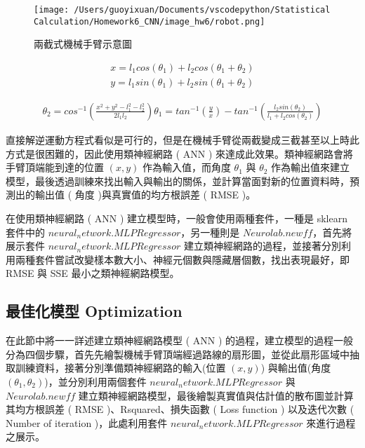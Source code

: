 \begin{figure}[H]
    \centering
        \texttt{[image: /Users/guoyixuan/Documents/vscodepython/Statistical Calculation/Homework6\_CNN/image\_hw6/robot.png]}
    \caption{兩截式機械手臂示意圖}
    \label{fig:robot}
\end{figure}

\begin{equation}\label{eq:fke}
\begin{split}
x=l_1 cos(\theta_1)+l_2 cos(\theta_1+\theta_2)\\
y=l_1 sin(\theta_1)+l_2 sin(\theta_1+\theta_2)
\end{split}
\end{equation}

\begin{equation}\label{eq:lke}
\begin{split}
\theta_2=cos^{-1}(\frac{x^2 + y^2 - l_1^2 - l_2^2}{2 l_1 l_2})
\theta_1 = tan^{-1}(\frac{y}{x})-tan^{-1}(\frac{l_2 sin(\theta_2)}{l_1 + l_2 cos(\theta_2)})
\end{split}
\end{equation}

直接解逆運動方程式看似是可行的，但是在機械手臂從兩截變成三截甚至以上時此方式是很困難的，因此使用類神經網路 ( ANN ) 來達成此效果。類神經網路會將手臂頂端能到達的位置 $(x,y)$ 作為輸入值，而角度 $\theta_1$ 與 $\theta_2$ 作為輸出值來建立模型，最後透過訓練來找出輸入與輸出的關係，並計算當面對新的位置資料時，預測出的輸出值 ( 角度 )與真實值的均方根誤差 ( RMSE )。

在使用類神經網路 ( ANN ) 建立模型時，一般會使用兩種套件，一種是 sklearn 套件中的 $neural_network.MLPRegressor$，另一種則是 $Neurolab.newff$，首先將展示套件 $neural_network.MLPRegressor$ 建立類神經網路的過程，並接著分別利用兩種套件嘗試改變樣本數大小、神經元個數與隱藏層個數，找出表現最好，即 RMSE 與 SSE 最小之類神經網路模型。

\subsection{最佳化模型 Optimization}

在此節中將一一詳述建立類神經網路模型 ( ANN ) 的過程，建立模型的過程一般分為四個步驟，首先先繪製機械手臂頂端經過路線的扇形圖，並從此扇形區域中抽取訓練資料，接著分別準備類神經網路的輸入(位置 $(x,y)$) 與輸出值(角度 $(\theta_1,\theta_2)$)，並分別利用兩個套件 $neural_network.MLPRegressor$ 與 $Neurolab.newff$ 建立類神經網路模型，最後繪製真實值與估計值的散布圖並計算其均方根誤差 ( RMSE )、Rsquared、損失函數 ( Loss function ) 以及迭代次數 ( Number of iteration )，此處利用套件 $neural_network.MLPRegressor$ 來進行過程之展示。

